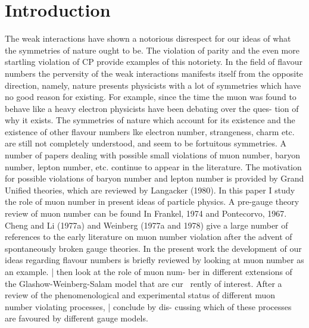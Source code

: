 \documentclass[twoside]{article}
\begin{document}
\section{Introduction}
The weak interactions have shown a notorious disrespect for our
ideas of what the symmetries of nature ought to be. The violation of
parity and the even more startling violation of CP provide examples of
this notoriety. In the field of flavour numbers the perversity of the
weak interactions manifests itself from the opposite direction, namely,
nature presents physicists with a lot of symmetries which have no good
reason for existing. For example, since the time the muon was found to
behave like a heavy electron physicists have been debating over the ques-
tion of why it exists. The symmetries of nature which account for its
existence and the existence of other flavour numbers lke electron
number, strangeness, charm etc. are still not completely understood,
and seem to be fortuitous symmetries. A number of papers dealing with
possible small violations of muon number, baryon number, lepton number,
etc. continue to appear in the literature. The motivation for possible
violations of baryon number and lepton number is provided by Grand
Unified theories, which are reviewed by Langacker (1980). In this paper
I study the role of muon number in present ideas of particle physics.
A pre-gauge theory review of muon number can be found In Frankel, 1974 and
Pontecorvo, 1967. Cheng and Li (1977a) and Weinberg (1977a and 1978) give a
large number of references to the early literature on muon number violation
after the advent of spontaneously broken gauge theories. In the present work
the development of our ideas regarding flavour numbers is briefly reviewed by
looking at muon number as an example. | then look at the role of muon num-
ber in different extensions of the Glashow-Weinberg-Salam model that are cur~
rently of interest. After a review of the phenomenological and experimental
status of different muon number violating processes, | conclude by dis-
cussing which of these processes are favoured by different gauge models.
\end{document}
